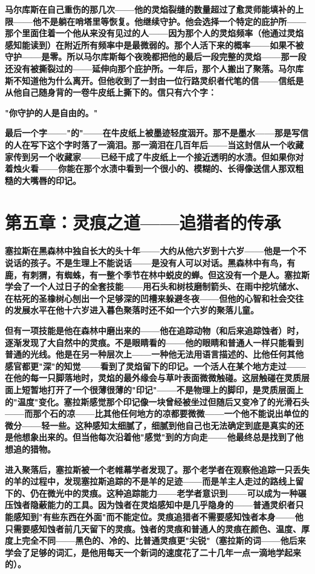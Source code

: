 \documentclass[12pt,a4paper,openany]{ctexbook}
\begin{document}
\textbf{马尔库斯在自己重伤的那几次——他的灵焰裂缝的数量超过了愈灵师能填补的上限——他不是躺在哨塔里等恢复。他继续守护。他会选择一个特定的庇护所——那个里面住着一个他从来没有见过的人——因为那个人的灵焰频率（他通过灵焰感知能读到）在附近所有频率中是最微弱的。那个人活下来的概率——如果不被守护——是零。所以马尔库斯每个夜晚都把他的最后一段完整的灵焰——那一段还没有被撕裂过的——延伸向那个庇护所。一年后，那个人搬出了聚落。马尔库斯不知道他为什么离开。但他收到了一封由一位行路灵织者代笔的信——信纸是从他自己随身背的一卷牛皮纸上撕下的。信只有六个字：}


\textbf{"你守护的人是自由的。"}


\textbf{最后一个字——"的"——在牛皮纸上被墨迹轻度洇开。那不是墨水——那是写信的人在写下这个字时落了一滴泪。那一滴泪在几百年后——当这封信从一个收藏家传到另一个收藏家——已经干成了牛皮纸上一个接近透明的水渍。但如果你对着烛火看——你能在那个水渍中看到一个很小的、模糊的、长得像送信人那双粗糙的大嘴唇的印记。}


\section*{第五章：灵痕之道——追猎者的传承}


\textbf{塞拉斯在黑森林中独自长大的头十年——大约从他六岁到十六岁——他是一个不说话的孩子。不是生理上不能说话——是没有人可以对话。黑森林中有鸟，有鹿，有刺猬，有蜘蛛，有一整个季节在林中蜕皮的蝉。但这没有一个是人。塞拉斯学会了一个人过日子的全套技能——用石头和树枝磨制箭头、在雨中挖坑储水、在枯死的圣橡树心刨出一个足够深的凹槽来躲避冬夜——但他的心智和社会交往的发展水平在他十六岁进入暮色聚落时还不如一个六岁的聚落儿童。}


\textbf{但有一项技能是他在森林中磨出来的——他在追踪动物（和后来追踪蚀者）时，逐渐发现了大自然中的灵痕。不是眼睛看的——他的眼睛和普通人一样只能看到普通的光线。他是在另一种层次上——一种他无法用语言描述的、比他任何其他感官都更"深"的知觉——看到了灵焰留下的印记。一个活人在某个地方走过——在他的每一只脚落地时，灵焰的最外缘会与草叶表面微微触碰。这层触碰在灵质层面上短暂地打开了一个很薄很薄的"印记"——不是物理上的脚印，是灵质层面上的"温度"变化。塞拉斯感觉那个印记像一块曾经被坐过但随后又变冷了的光滑石头——而那个石的凉——比其他任何地方的凉都要微微——一个他不能说出单位的微分——轻一些。这种感知太细腻了，细腻到他自己也无法确定到底是真实的还是他想象出来的。但当他每次沿着他"感觉"到的方向走——他最终总是找到了他想追的猎物。}


\textbf{进入聚落后，塞拉斯被一个老帷幕学者发现了。那个老学者在观察他追踪一只丢失的羊的过程中，发现塞拉斯追踪的不是羊的足迹——而是羊主人走过的路线上留下的、仍在微光中的灵痕。这种追踪能力——老学者意识到——可以成为一种碾压蚀者隐蔽能力的工具。因为蚀者在灵焰感知中是几乎隐身的——普通灵织者只能感知到"有些东西在外面"而不能定位。灵痕追猎者不需要感知蚀者本身——他只需要感知蚀者前几天留下的灵痕。蚀者的灵痕和普通人的灵痕在颜色、温度、厚度上完全不同——黑色的、冷的、比普通灵痕更"尖锐"（塞拉斯的词——他后来学会了足够的词汇，是他用每天一个新词的速度花了二十几年一点一滴地学起来的）。}
\end{document}
